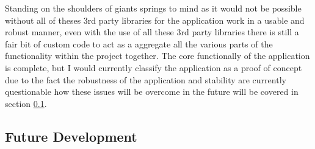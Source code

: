 \noindent
Standing on the shoulders of giants springs to mind as it would not be possible without all of theses 3rd party libraries for the application work in a usable and robust manner, even with the use of all these 3rd party libraries there is still a fair bit of custom code to act as a aggregate all the various parts of the functionality within the project together. The core functionally of the application is complete, but I would currently classify the application as a proof of concept due to the fact the robustness of the application and stability are currently questionable how these issues will be overcome in the future will be covered in section \ref{sec:development_future_dev}.\\

\subsection{Future Development}
\label{sec:development_future_dev}

